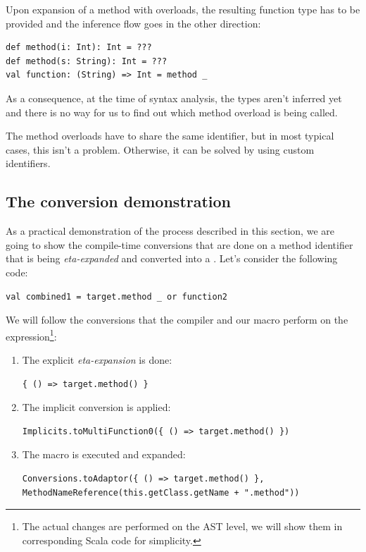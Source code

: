 Upon expansion of a method with overloads, the resulting function type has to be provided and the inference flow goes in the other direction:
\lstset{style=Scala}
\begin{lstlisting}
def method(i: Int): Int = ???
def method(s: String): Int = ???
val function: (String) => Int = method _
\end{lstlisting}

As a consequence, at the time of syntax analysis, the types aren't inferred yet and there is no way for us to find out which method overload is being called.

The method overloads have to share the same identifier, but in most typical cases, this isn't a problem. Otherwise, it can be solved by using custom identifiers.

\subsection{The conversion demonstration}

As a practical demonstration of the process described in this section, we are going to show the compile-time conversions that are done on a method identifier that is being \textit{eta-expanded} and converted into a . Let's consider the following code:

\lstset{style=Scala}
\begin{lstlisting}
val combined1 = target.method _ or function2
\end{lstlisting}

We will follow the conversions that the compiler and our macro perform on the  expression\footnote{The actual changes are performed on the AST level, we will show them in corresponding Scala code for simplicity.}:

\begin{enumerate}
	\item The explicit \textit{eta-expansion} is done:
	\lstset{style=Scala}
	\begin{lstlisting}
{ () => target.method() }
	\end{lstlisting}
	\item The implicit conversion is applied:
		\lstset{style=Scala}
	\begin{lstlisting}
Implicits.toMultiFunction0({ () => target.method() })
		\end{lstlisting}
		\item The macro  is executed and expanded:
		\lstset{style=Scala}
		\begin{lstlisting}
Conversions.toAdaptor({ () => target.method() }, MethodNameReference(this.getClass.getName + ".method"))
		\end{lstlisting}
\end{enumerate}

